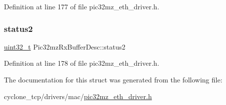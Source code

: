 Definition at line 177 of file pic32mz\+\_\+eth\+\_\+driver.\+h.

\mbox{\label{structPic32mzRxBufferDesc_a86067cf8e17a8a2d204b251022cd55ce}} 
\subsubsection{\texorpdfstring{status2}{status2}}
{\footnotesize\ttfamily \hyperlink{stdint_8h_a435d1572bf3f880d55459d9805097f62}{uint32\+\_\+t} Pic32mz\+Rx\+Buffer\+Desc\+::status2}



Definition at line 178 of file pic32mz\+\_\+eth\+\_\+driver.\+h.



The documentation for this struct was generated from the following file\+:\begin{DoxyCompactItemize}
\item 
cyclone\+\_\+tcp/drivers/mac/\hyperlink{pic32mz__eth__driver_8h}{pic32mz\+\_\+eth\+\_\+driver.\+h}\end{DoxyCompactItemize}
